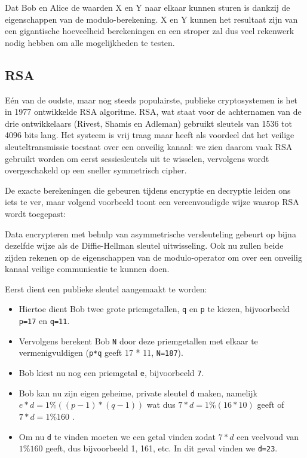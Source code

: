 \documentclass[
  10pt,
  dutch,
  paper=a4,
  ,captions=tableheading
]{scrbook}
\providecommand{\tightlist}{%
  \setlength{\itemsep}{0pt}\setlength{\parskip}{0pt}}
\begin{document}
\begin{noteblock}
Dat Bob en Alice de waarden X en Y naar elkaar kunnen sturen is dankzij
de eigenschappen van de modulo-berekening. X en Y kunnen het resultaat
zijn van een gigantische hoeveelheid berekeningen en een stroper zal dus
veel rekenwerk nodig hebben om alle mogelijkheden te testen.
\end{noteblock}

\subsection{RSA}\label{rsa}

Eén van de oudste, maar nog steeds populairste, publieke cryptosystemen
is het in 1977 ontwikkelde RSA algoritme. RSA, wat staat voor de
achternamen van de drie ontwikkelaars (Rivest, Shamis en Adleman)
gebruikt sleutels van 1536 tot 4096 bits lang. Het systeem is vrij traag
maar heeft als voordeel dat het veilige sleuteltransmissie toestaat over
een onveilig kanaal: we zien daarom vaak RSA gebruikt worden om eerst
sessiesleutels uit te wisselen, vervolgens wordt overgeschakeld op een
sneller symmetrisch cipher.

De exacte berekeningen die gebeuren tijdens encryptie en decryptie
leiden ons iets te ver, maar volgend voorbeeld toont een vereenvoudigde
wijze waarop RSA wordt toegepast:

Data encrypteren met behulp van asymmetrische versleuteling gebeurt op
bijna dezelfde wijze als de Diffie-Hellman sleutel uitwisseling. Ook nu
zullen beide zijden rekenen op de eigenschappen van de modulo-operator
om over een onveilig kanaal veilige communicatie te kunnen doen.

Eerst dient een publieke sleutel aangemaakt te worden:

\begin{itemize}
\tightlist
\item
  Hiertoe dient Bob twee grote priemgetallen, \texttt{q} en \texttt{p}
  te kiezen, bijvoorbeeld \texttt{p=17} en \texttt{q=11}.
\item
  Vervolgens berekent Bob \texttt{N} door deze priemgetallen met elkaar
  te vermenigvuldigen (\texttt{p*q} geeft 17 * 11, \texttt{N=187}).
\item
  Bob kiest nu nog een priemgetal \texttt{e}, bijvoorbeeld \texttt{7}.
\item
  Bob kan nu zijn eigen geheime, private sleutel \texttt{d} maken,
  namelijk \(e*d = 1\%((p-1)*(q-1))\) wat dus \(7*d=1\%(16*10)\) geeft
  of \(7*d=1\%160\) .
\item
  Om nu \texttt{d} te vinden moeten we een getal vinden zodat \(7*d\)
  een veelvoud van \(1\%160\) geeft, dus bijvoorbeeld 1, 161, etc. In
  dit geval vinden we \texttt{d=23}.
\end{itemize}
\end{document}
